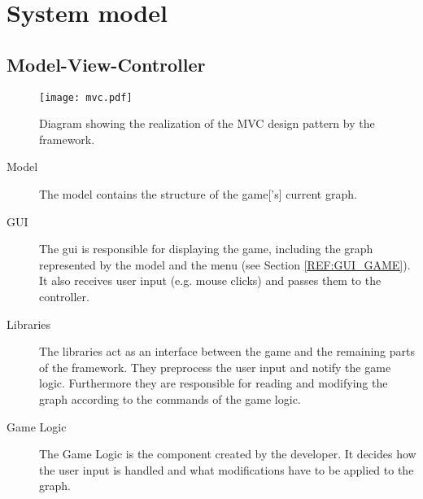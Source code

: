 \section{System model}

\subsection{Model-View-Controller}


\begin{figure}[h]
	\centering
	\texttt{[image: mvc.pdf]}
	\caption{Diagram showing the realization of the \gls{MVC} design pattern by the framework.}
	\label{img:MVC}
\end{figure}

\begin{description}
\item[Model] The model contains the structure of the \gls{game}['s] current \gls{graph}.
\item[GUI] The \gls{gui} is responsible for displaying the game, including the \gls{graph} represented by the model and the menu (see Section \ref{REF:GUI_GAME}). It also receives user input (e.g. mouse clicks) and passes them to the controller.
\item[Libraries] The libraries act as an interface between the game and the remaining parts of the framework. They preprocess the user input and notify the game logic. Furthermore they are responsible for reading and modifying the \gls{graph} according to the commands of the game logic.
\item[Game Logic] The Game Logic is the component created by the \gls{developer}. It decides how the user input is handled and what modifications have to be applied to the \gls{graph}. 
\end{description}